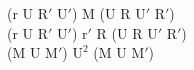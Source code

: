 (r U $\text{R}'$ $\text{U}'$) M (U R $\text{U}'$ $\text{R}'$)\\
(r U $\text{R}'$ $\text{U}'$) $\text{r}'$ R (U R $\text{U}'$ $\text{R}'$)\\
(M U $\text{M}'$) $\text{U}^2$ (M U $\text{M}'$)\\
